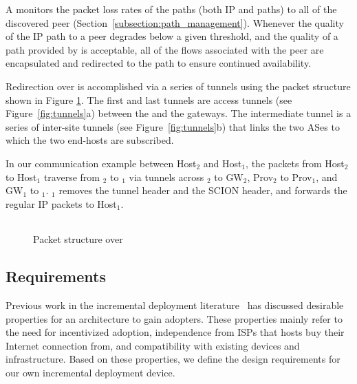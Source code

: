 A \name monitors the packet loss  rates of the paths (both IP and \scion paths)
to all of the discovered peer \names
(Section~\ref{subsection:path_management}). Whenever the quality of the IP path
to a peer \name degrades below a given threshold, and the quality of a path
provided by \scion is acceptable, all of the flows associated with the peer
\name are encapsulated and redirected to the \scion path to ensure continued
availability.


Redirection over \scion is accomplished via a series of tunnels using the
packet structure shown in Figure \ref{fig:pkt_structure}. The first and last
tunnels are access tunnels (see Figure~\ref{fig:tunnels}a) between the \names
and the \scion gateways.  The intermediate tunnel is a series of inter-site
tunnels (see Figure~\ref{fig:tunnels}b) that links the two \scion ASes to which
the two end-hosts are subscribed. 

In our communication example between Host$_2$ and Host$_1$, the packets from
Host$_2$ to Host$_1$ traverse from \namens$_2$ to \namens$_1$ via tunnels
across \namens$_2$ to GW$_2$, Prov$_2$ to Prov$_1$, and GW$_1$ to \namens$_1$.
\namens$_1$ removes the tunnel header and the SCION header, and forwards the
regular IP packets to Host$_1$.

\begin{figure}[h]
\renewcommand{\arraystretch}{2.5}
\linespread{0.5}\selectfont\centering
\begin{tabular} {|c|c|c|c|}
\hline
\parbox[c][][t]{1.3cm}{} &
\parbox[c][][t]{1.3cm}{} &
\parbox[c][][t]{1.7cm}{} &
\parbox[c][][t]{1.7cm}{}\\[1pt]
\hline
\end{tabular}

\caption{Packet structure over \scion}
\label{fig:pkt_structure}
\end{figure}

\subsection{Requirements}
\label{subsection:requirements}

Previous work in the incremental deployment literature~\cite{Evolvable2005,
LISPDeployment2012, Handley2006} has discussed desirable properties for an
architecture to gain adopters. These properties mainly refer to the need for
incentivized adoption, independence from ISPs that hosts buy their Internet
connection from, and compatibility with existing devices and infrastructure.
Based on these properties, we define the design requirements for our own
incremental deployment device.

